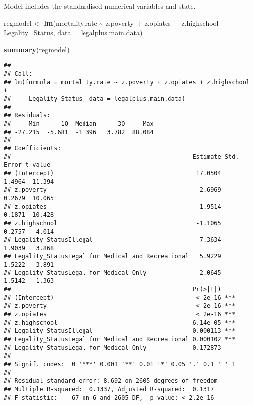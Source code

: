 \documentclass[
]{article}
\newenvironment{Shaded}{\begin{snugshade}}{\end{snugshade}}
\newcommand{\AttributeTok}[1]{\textcolor[rgb]{0.13,0.29,0.53}{#1}}
\newcommand{\CommentTok}[1]{\textcolor[rgb]{0.56,0.35,0.01}{\textit{#1}}}
\newcommand{\FunctionTok}[1]{\textcolor[rgb]{0.13,0.29,0.53}{\textbf{#1}}}
\newcommand{\NormalTok}[1]{#1}
\newcommand{\OtherTok}[1]{\textcolor[rgb]{0.56,0.35,0.01}{#1}}
\newcommand{\SpecialCharTok}[1]{\textcolor[rgb]{0.81,0.36,0.00}{\textbf{#1}}}
\newcommand{\StringTok}[1]{\textcolor[rgb]{0.31,0.60,0.02}{#1}}
\begin{document}
\begin{Shaded}
\end{Shaded}

Model includes the standardised numerical variables and state.

\begin{Shaded}
\begin{Highlighting}[]
\NormalTok{regmodel }\OtherTok{\textless{}{-}} \FunctionTok{lm}\NormalTok{(mortality.rate }\SpecialCharTok{\textasciitilde{}}\NormalTok{ z.poverty }\SpecialCharTok{+}\NormalTok{ z.opiates }\SpecialCharTok{+}\NormalTok{ z.highschool  }\SpecialCharTok{+}\NormalTok{ Legality\_Status, }\AttributeTok{data =}\NormalTok{ legalplus.main.data)}

\FunctionTok{summary}\NormalTok{(regmodel)}
\end{Highlighting}
\end{Shaded}

\begin{verbatim}
## 
## Call:
## lm(formula = mortality.rate ~ z.poverty + z.opiates + z.highschool + 
##     Legality_Status, data = legalplus.main.data)
## 
## Residuals:
##     Min      1Q  Median      3Q     Max 
## -27.215  -5.681  -1.396   3.782  88.084 
## 
## Coefficients:
##                                                   Estimate Std. Error t value
## (Intercept)                                        17.0504     1.4964  11.394
## z.poverty                                           2.6969     0.2679  10.065
## z.opiates                                           1.9514     0.1871  10.428
## z.highschool                                       -1.1065     0.2757  -4.014
## Legality_StatusIllegal                              7.3634     1.9039   3.868
## Legality_StatusLegal for Medical and Recreational   5.9229     1.5222   3.891
## Legality_StatusLegal for Medical Only               2.0645     1.5142   1.363
##                                                   Pr(>|t|)    
## (Intercept)                                        < 2e-16 ***
## z.poverty                                          < 2e-16 ***
## z.opiates                                          < 2e-16 ***
## z.highschool                                      6.14e-05 ***
## Legality_StatusIllegal                            0.000113 ***
## Legality_StatusLegal for Medical and Recreational 0.000102 ***
## Legality_StatusLegal for Medical Only             0.172873    
## ---
## Signif. codes:  0 '***' 0.001 '**' 0.01 '*' 0.05 '.' 0.1 ' ' 1
## 
## Residual standard error: 8.692 on 2605 degrees of freedom
## Multiple R-squared:  0.1337, Adjusted R-squared:  0.1317 
## F-statistic:    67 on 6 and 2605 DF,  p-value: < 2.2e-16
\end{verbatim}
\end{document}
